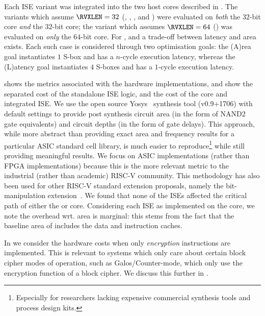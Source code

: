 
Each ISE variant was integrated into the two host cores 
described in .
The variants which assume  $\RVXLEN = 32$
(, , , and ) 
were evaluated
on {\em both} the
$32$-bit  core
{\em  and} the
$32$-bit  core;
the variant  which assumes $\RVXLEN = 64$
()
was  evaluated
on {\em only} the
$64$-bit  core.
For ,  and  a trade-off
between latency and area exists. 
Each such case is considered through two optimisation goals:
the (A)rea    goal
instantiates $1$ S-box   and has a $n$-cycle execution latency,
whereas
the (L)atency goal
instantiates $4$ S-boxes and has a $1$-cycle execution latency.

shows the metrics associated with the hardware implementations, 
and show the separated cost of the standalone ISE logic, and the
cost of the core and integrated ISE.
We use the open source Yosys~\cite{yosys} synthesis tool (v0.9+1706)
with default settings
to provide post synthesis circuit area (in the form of NAND2 gate
equivalents) and circuit depths (in the form of gate delays).
This approach, while more abstract than providing exact area and
frequency results for a particular ASIC standard cell library, is
much easier to reproduce\footnote{
Especially
for researchers lacking expensive commercial
synthesis tools and process design kits.
} while still providing meaningful results.
We focus on ASIC implementations (rather than FPGA implementations)
because this is the more relevant metric to the industrial (rather than
academic) RISC-V community.
This methodology has also been used for other RISC-V standard extension
proposals, namely the bit-manipulation extension~\cite[Section 3.1, Page 54]{riscv:bitmanip:draft}.
We found 
that none of the ISEs affected the critical path of either the  
or  core.
Considering each ISE as implemented on the  core, we note the 
overhead wrt. area is marginal: this stems from the fact that the 
baseline area of  includes the data and instruction caches.

In
we consider the hardware costs when only {\em encryption} instructions are
implemented.
This is relevant to systems which only care about certain block cipher
modes of operation, such as Galos/Counter-mode,
which only use the encryption function of a block cipher.
We discuss this further in .

